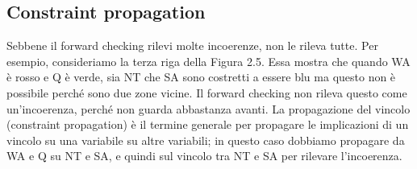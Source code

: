 \subsection{Constraint propagation}
Sebbene il forward checking rilevi molte incoerenze, non le rileva tutte. Per
esempio, consideriamo la terza riga della Figura 2.5. Essa mostra che quando WA
è rosso e Q è verde, sia NT che SA sono costretti a essere blu ma questo non è
possibile perché sono due zone vicine. Il forward checking non rileva questo
come un'incoerenza, perché non guarda abbastanza avanti. La propagazione del
vincolo (constraint propagation) è il termine generale per propagare le
implicazioni di un vincolo su una variabile su altre variabili; in questo caso
dobbiamo propagare da WA e Q su NT e SA, e quindi sul vincolo tra NT e SA per
rilevare l'incoerenza.

